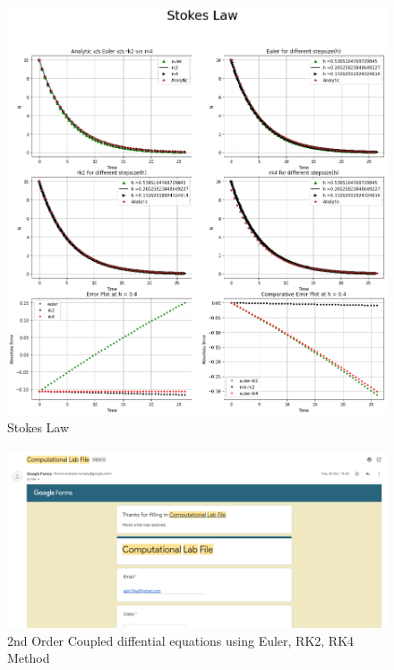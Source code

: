 \documentclass{article}
\begin{document}
\newpage
\begin{figure}[h]
    \centering
    \includegraphics[width=14cm,height=12cm \textwidth]{Euler/stokes.png}
\caption{Stokes Law}
\end{figure}
\newpage
\begin{figure}[h]
    \centering
    \includegraphics[width=15cm,height=13cm \textwidth]{5.PNG}
\caption{2nd Order Coupled diffential equations using Euler, RK2, RK4 Method}
\end{figure}
\end{document}
